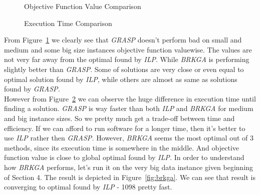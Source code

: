\documentclass{article}
\newcommand\tab[1][1cm]{\hspace*{#1}}
\begin{document}
\begin{figure}[!htbp]
	\caption{Objective Function Value Comparison}
	\label{fig:compobjvalue}
\end{figure}

\begin{figure}[!htbp]
	\caption{Execution Time Comparison}
	\label{fig:comptime}
\end{figure}

From Figure~\ref{fig:compobjvalue} we clearly see that \textit{GRASP} doesn't perform bad on small and medium and some big size instances objective function valuewise. The values are not very far away from the optimal found by \textit{ILP}. While \textit{BRKGA} is performing slightly better than \textit{GRASP}. Some of solutions are very close or even equal to optimal solution found by \textit{ILP}, while others are almost as same as solutions found by \textit{GRASP.}\\
\tab However from Figure~\ref{fig:comptime} we can observe the huge difference in execution time until finding a solution. \textit{GRASP} is way faster than both \textit{ILP} and \textit{BRKGA} for medium and big instance sizes. So we pretty much get a trade-off between time and efficiency. If we can afford to run software for a longer time, then it's better to use \textit{ILP} rather then \textit{GRASP.} However, \textit{BRKGA} seems the most optimal out of 3 methods, since its execution time is somewhere in the middle. And objective function value is close to global optimal found by \textit{ILP.}
\tab In order to understand how \textit{BRKGA} performs, let's run it on the very big data instance given beginning of Section 4. The result is depicted in Figure~\ref{fig:brkga}. We can see that result is converging to optimal found by \textit{ILP} - 1098 pretty fast.
\end{document}
